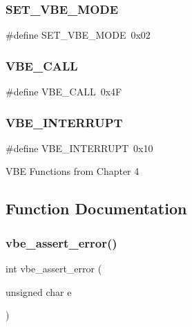 \hypertarget{group__vbe_gab32156e1d72cb92b120bb16883c87eea}{}\label{group__vbe_gab32156e1d72cb92b120bb16883c87eea} 
\subsubsection{\texorpdfstring{S\+E\+T\+\_\+\+V\+B\+E\+\_\+\+M\+O\+DE}{SET\_VBE\_MODE}}
{\footnotesize\ttfamily \#define S\+E\+T\+\_\+\+V\+B\+E\+\_\+\+M\+O\+DE~0x02}

\hypertarget{group__vbe_gaaa7fbe1e02a424af8eb9efc320d936c0}{}\label{group__vbe_gaaa7fbe1e02a424af8eb9efc320d936c0} 
\subsubsection{\texorpdfstring{V\+B\+E\+\_\+\+C\+A\+LL}{VBE\_CALL}}
{\footnotesize\ttfamily \#define V\+B\+E\+\_\+\+C\+A\+LL~0x4F}

\hypertarget{group__vbe_ga13e1037464e7407d1df6aa4041b180cd}{}\label{group__vbe_ga13e1037464e7407d1df6aa4041b180cd} 
\subsubsection{\texorpdfstring{V\+B\+E\+\_\+\+I\+N\+T\+E\+R\+R\+U\+PT}{VBE\_INTERRUPT}}
{\footnotesize\ttfamily \#define V\+B\+E\+\_\+\+I\+N\+T\+E\+R\+R\+U\+PT~0x10}

V\+BE Functions from Chapter 4 

\subsection{Function Documentation}
\hypertarget{group__vbe_ga71fc62857544124047314f3142672cfc}{}\label{group__vbe_ga71fc62857544124047314f3142672cfc} 
\subsubsection{\texorpdfstring{vbe\+\_\+assert\+\_\+error()}{vbe\_assert\_error()}}
{\footnotesize\ttfamily int vbe\+\_\+assert\+\_\+error (\begin{DoxyParamCaption}\item[{unsigned char}]{e }\end{DoxyParamCaption})}



